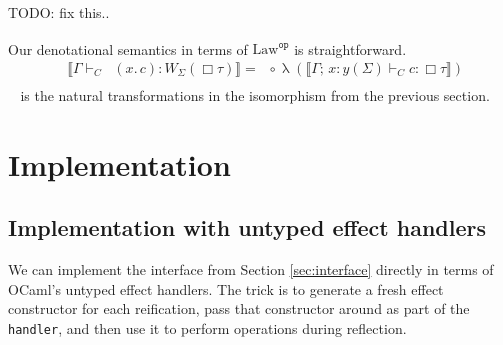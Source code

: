 \documentclass[acmsmall, screen, nonacm]{acmart}
\theoremstyle{definition}
\newcommand{\glob}{\mathop{\Box}}
\newcommand{\lawc}{\mathrm{Law}}
\newcommand{\lawcop}{\lawc^{\mathtt{op}}}
\newcommand{\pshlawcop}{\widehat{\lawcop}}
\newcommand{\yoneda}[1]{y(#1)}
\newcommand{\sem}[1]{\llbracket #1 \rrbracket}
\newcommand{\reifyname}{\Downarrow}
\newcommand{\reifyraw}[1]{\mathop{\reifyname_{#1}}}
\newcommand{\reify}[3]{\reifyraw{#1}(#2.\,#3)}
\newcommand{\reifyc}[2]{\mathop{\reifyname_{#1 #2}}}
\newcommand{\ind}[1]{W_{#1}}
\newcommand{\types}{\mathrel{:}}
\newcommand{\ccons}[2]{#1;\,#2}
\newcommand{\lbind}[3]{\ccons{#1}{#2\types#3}}
\newcommand{\turnc}{\mathrel{\vdash_C}}
\newcommand{\currymap}{\mathop{\lambda}}
\newcommand{\todo}[1]{{\color{red}TODO: #1}}
\begin{document}
\todo{fix this..}

Our denotational semantics in terms of $\pshlawcop$ is
straightforward.
\begin{align*}
&\sem{\Gamma \turnc \reify{\Sigma}{x}{c} \types \ind{\Sigma}(\glob \tau)} =
  \reifyc{\Sigma}{\tau} \circ \currymap(\sem{\lbind{\Gamma}{x}{\yoneda{\Sigma}} \turnc c \types \glob \tau}) \\
\end{align*}
$\reifyc{\Sigma}{}$ is the natural transformations in the isomorphism
from the previous section.

\section{Implementation}
\label{sec:implementation}

\subsection{Implementation with untyped effect handlers}

We can implement the interface from Section \ref{sec:interface} directly
in terms of OCaml's untyped effect
handlers\cite{Sivaramakrishnan2021retrofitting}. The trick is to
generate a fresh effect constructor for each reification, pass that
constructor around as part of the \lstinline[style=oxcaml]{handler}, and
then use it to perform operations during reflection.
\end{document}
